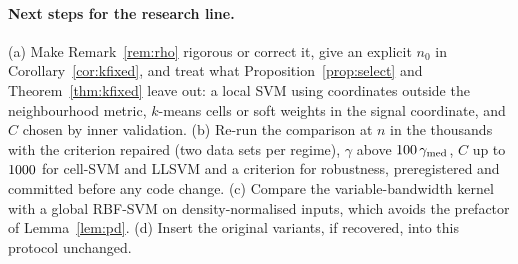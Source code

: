 \documentclass[11pt,a4paper]{article}
\theoremstyle{plain}
\theoremstyle{definition}
\theoremstyle{remark}
\begin{document}
\paragraph{Next steps for the research line.} (a) Make Remark~\ref{rem:rho} rigorous or correct it, give an explicit $n_0$ in Corollary~\ref{cor:kfixed}, and treat what Proposition~\ref{prop:select} and Theorem~\ref{thm:kfixed} leave out: a local SVM using coordinates outside the neighbourhood metric, $k$-means cells or soft weights in the signal coordinate, and $C$ chosen by inner validation. (b) Re-run the comparison at $n$ in the thousands with the criterion repaired (two data sets per regime), $\gamma$ above $100\,\gamma_{\mathrm{med}}$, $C$ up to $1000$ for cell-SVM and LLSVM and a criterion for robustness, preregistered and committed before any code change. (c) Compare the variable-bandwidth kernel with a global RBF-SVM on density-normalised inputs, which avoids the prefactor of Lemma~\ref{lem:pd}. (d) Insert the original variants, if recovered, into this protocol unchanged.

\appendix
\end{document}
